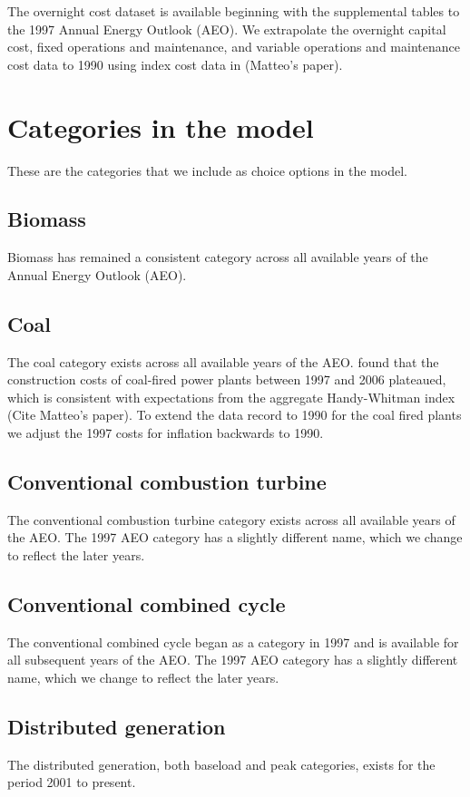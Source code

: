 \documentclass[10pt]{report}
\begin{document}
The overnight cost dataset is available beginning with the supplemental tables to the 1997 Annual Energy Outlook (AEO). 
We extrapolate the overnight capital cost, fixed operations and maintenance, and variable operations and maintenance cost data to 1990 using index cost data in \parencite{}(Matteo's paper). 

\section{Categories in the model}
These are the categories that we include as choice options in the model.

\subsection{Biomass}
Biomass has remained a consistent category across all available years of the Annual Energy Outlook (AEO). 

\subsection{Coal}
The coal category exists across all available years of the AEO.  
\cite{mcnerney2011historical} found that the construction costs of coal-fired power plants between 1997 and 2006 plateaued, which is consistent with expectations from the aggregate Handy-Whitman index \parencite{}(Cite Matteo's paper).
To extend the data record to 1990 for the coal fired plants we adjust the 1997 costs for inflation backwards to 1990. 
 
\subsection{Conventional combustion turbine}
The conventional combustion turbine category exists across all available years of the AEO.
The 1997 AEO category has a slightly different name, which we change to reflect the later years.  

\subsection{Conventional combined cycle}
The conventional combined cycle began as a category in 1997 and is available for all subsequent years of the AEO. 
The 1997 AEO category has a slightly different name, which we change to reflect the later years. 

\subsection{Distributed generation}
The distributed generation, both baseload and peak categories, exists for the period 2001 to present. 
\end{document}
